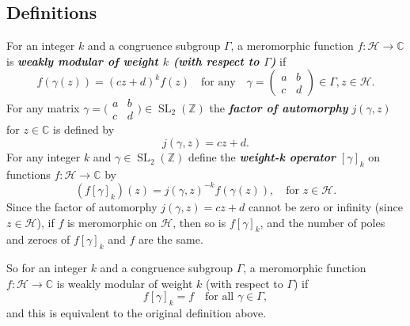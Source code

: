 \documentclass[10pt,leqno]{article}
\newcommand{\textib}[1]{\textbf{\textit{#1}}}
\DeclareMathOperator{\SL}{SL}
\begin{document}
\subsection{Definitions}
For an integer $k$ and a congruence subgroup $\varGamma$, a meromorphic function $f\colon \mathcal H\to \mathbb{C}$ is \textib{weakly modular of weight $k$ (with respect to $\varGamma$)} if \[f(\gamma(z)) = (cz+d)^kf(z)\quad\text{for any}\quad \gamma = \begin{pmatrix}
    a & b \\ c & d
\end{pmatrix}\in \varGamma, z\in \mathcal H.\]
For any matrix $\gamma=\big(\!\begin{smallmatrix}
    a & b \\ c & d
\end{smallmatrix}\!\big)\in \SL_2(\mathbb{Z})$ the \textib{factor of automorphy} $j(\gamma,z)$ for $z\in \mathbb{C}$ is defined by \[j(\gamma,z) = cz+d.\] For any integer $k$ and $\gamma\in \SL_2(\mathbb{Z})$ define the \textib{weight-k operator} $[\gamma]_k$ on functions $f\colon \mathcal H\to \mathbb{C}$ by \[(f[\gamma]_k)(z) = j(\gamma,z)^{-k}f(\gamma(z)),\quad\text{for } z\in \mathcal H.\]
Since the factor of automorphy $j(\gamma,z) = cz+d$ cannot be zero or infinity (since $z\in \mathcal H$), if $f$ is meromorphic on $\mathcal H$, then so is $f[\gamma]_k$, and the number of poles and zeroes of $f[\gamma]_k$ and $f$ are the same.

So for an integer $k$ and a congruence subgroup $\varGamma$, a meromorphic function $f\colon \mathcal H \to \mathbb{C}$ is weakly modular of weight $k$ (with respect to $\varGamma$) if \[f[\gamma]_k = f\quad\text{for all }\gamma\in \varGamma,\] and this is equivalent to the original definition above.
\end{document}
